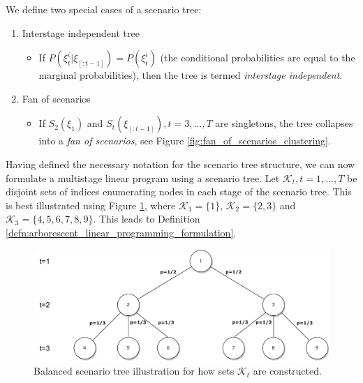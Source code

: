 We define two special cases of a scenario tree:
\begin{enumerate}
\item Interstage independent tree
	\begin{itemize}
		\item If $P(\xi_t^i|\xi_{[:t-1]})=P(\xi_t^i)$ (the conditional probabilities are equal to the marginal probabilities), then the tree is termed \textit{interstage independent}.
	\end{itemize}
\item Fan of scenarios
	\begin{itemize}
		\item If $S_2(\xi_1)$ and $S_t(\xi_{[:t-1]}), t=3,\dots,T$ are singletons, the tree collapses into a 		\textit{fan of scenarios}, see Figure \ref{fig:fan_of_scenarios_clustering}.
	\end{itemize}
\end{enumerate}
Having defined the necessary notation for the scenario tree structure, we can now formulate a multistage linear program using a scenario tree. Let $\mathcal{K}_t, t=1,\dots,T$ be disjoint sets of indices enumerating nodes in each stage of the scenario tree.
This is best illustrated using Figure \ref{fig:balanced_scenario_tree_illustration_sets_kt}, where $\mathcal{K}_1=\{1\}$, $\mathcal{K}_2=\{2,3\}$ and $\mathcal{K}_3=\{4,5,6,7,8,9\}$. This leads to Definition \ref{defn:arborescent_linear_programming_formulation}.

\begin{figure}
  \includegraphics[width=\linewidth]{../img/scenario_tree_balanced_kt_enumeration.pdf}
  \caption{Balanced scenario tree illustration for how sets $\mathcal{K}_t$ are constructed.}
  \label{fig:balanced_scenario_tree_illustration_sets_kt}
\end{figure}


